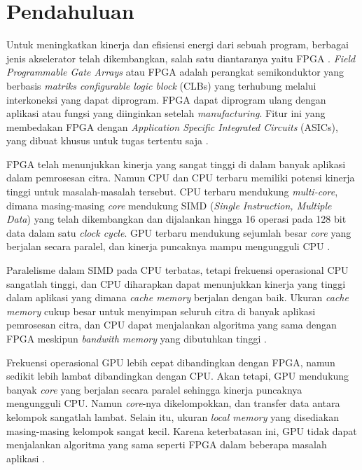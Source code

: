 
\section{Pendahuluan}

Untuk meningkatkan kinerja dan efisiensi energi dari sebuah program, berbagai jenis akselerator telah dikembangkan, salah satu diantaranya yaitu FPGA \cite{lb:cong}. \textit{Field Programmable Gate Arrays} atau FPGA adalah perangkat semikonduktor yang berbasis \textit{matriks configurable logic block} (CLBs) yang terhubung melalui interkoneksi yang dapat diprogram. FPGA dapat diprogram ulang dengan aplikasi atau fungsi yang diinginkan setelah \textit{manufacturing}. Fitur ini yang membedakan FPGA dengan \textit{Application Specific Integrated Circuits} (ASICs), yang dibuat khusus untuk tugas tertentu saja \cite{XILINX}.

FPGA telah menunjukkan kinerja yang sangat tinggi di dalam banyak aplikasi dalam pemrosesan citra. Namun CPU dan CPU terbaru memiliki potensi kinerja tinggi untuk masalah-masalah tersebut. CPU terbaru mendukung \textit{multi-core}, dimana masing-masing \textit{core} mendukung SIMD (\textit{Single Instruction, Multiple Data}) yang telah dikembangkan dan dijalankan hingga 16 operasi pada 128 bit data dalam satu \textit{clock cycle}. GPU terbaru mendukung sejumlah besar \textit{core} yang berjalan secara paralel, dan kinerja puncaknya mampu mengungguli CPU \cite{lb:asano}.

Paralelisme dalam SIMD pada CPU terbatas, tetapi frekuensi operasional CPU sangatlah tinggi, dan CPU diharapkan dapat menunjukkan kinerja yang tinggi dalam aplikasi yang dimana \textit{cache memory} berjalan dengan baik. Ukuran \textit{cache memory} cukup besar untuk menyimpan seluruh citra di banyak aplikasi pemrosesan citra, dan CPU dapat menjalankan algoritma yang sama dengan FPGA meskipun \textit{bandwith memory} yang dibutuhkan tinggi \cite{lb:asano}.

Frekuensi operasional GPU lebih cepat dibandingkan dengan FPGA, namun sedikit lebih lambat dibandingkan dengan CPU. Akan tetapi, GPU mendukung banyak \textit{core} yang berjalan secara paralel sehingga kinerja puncaknya mengungguli CPU. Namun \textit{core}-nya dikelompokkan, dan transfer data antara kelompok sangatlah lambat. Selain itu, ukuran \textit{local memory} yang disediakan masing-masing kelompok sangat kecil. Karena keterbatasan ini, GPU tidak dapat menjalankan algoritma yang sama seperti FPGA dalam beberapa masalah aplikasi \cite{lb:asano}.

